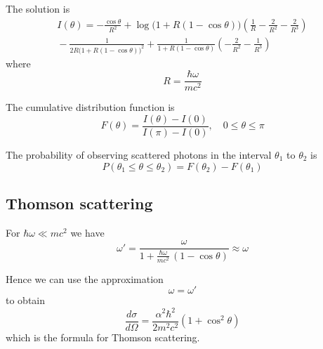 \documentclass[12pt]{article}
\begin{document}
The solution is
\begin{multline*}
I(\theta)=-\frac{\cos\theta}{R^2}
+\log\big(1+R(1-\cos\theta)\big)\left(\frac{1}{R}-\frac{2}{R^2}-\frac{2}{R^3}\right)
\\
{}-\frac{1}{2R\big(1+R(1-\cos\theta)\big)^2}
+\frac{1}{1+R(1-\cos\theta)}\left(-\frac{2}{R^2}-\frac{1}{R^3}\right)
\end{multline*}
where
\begin{equation*}
R=\frac{\hbar\omega}{mc^2}
\end{equation*}

\iffalse
Here is a computer solution for $I(\theta)$ where $\text{\tt R}\equiv\hbar\omega/mc^2$.
\begin{verbatim}
I = -R^2 / (-R^3 + R^3 cos(theta) - R^2) -
    R / (-R^3 + R^3 cos(theta) - R^2) +
    2 R / (-R^4 + R^4 cos(theta) - R^3) -
    1 / (R (R (-cos(theta) + 1) + 1)) -
    1 / (2 R (R (-cos(theta) + 1) + 1)^2) +
    log(R - R cos(theta) + 1) / R -
    cos(theta) / R^2 -
    2 log(R - R cos(theta) + 1) / R^2 -
    2 log(R - R cos(theta) + 1) / R^3 +
    1 / (-R^4 + R^4 cos(theta) - R^3) -
    1 / (R (-cos(theta) + 1) + 1)
\end{verbatim}
\fi

The cumulative distribution function is
\begin{equation*}
F(\theta)=\frac{I(\theta)-I(0)}{I(\pi)-I(0)},
\quad
0\le\theta\le\pi
\end{equation*}

The probability of observing scattered photons in the interval $\theta_1$ to $\theta_2$ is
\begin{equation*}
P(\theta_1\le\theta\le\theta_2)=F(\theta_2)-F(\theta_1)
\end{equation*}

\subsection*{Thomson scattering}
For $\hbar\omega\ll mc^2$ we have
\begin{equation*}
\omega'=\frac{\omega}{1+\frac{\hbar\omega}{mc^2}\,(1-\cos\theta)}\approx\omega
\end{equation*}

Hence we can use the approximation
\begin{equation*}
\omega=\omega'
\end{equation*}
to obtain
\begin{equation*}
\frac{d\sigma}{d\Omega}=\frac{\alpha^2\hbar^2}{2m^2c^2}\left(1+\cos^2\theta\right)
\end{equation*}
which is the formula for Thomson scattering.
\end{document}

